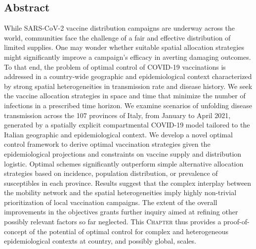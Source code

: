\begin{fullwidth}
\section{Abstract}
While SARS-CoV-2 vaccine distribution campaigns are underway across the world, communities face the challenge of a fair and effective distribution of limited supplies. One may wonder whether suitable spatial allocation strategies might significantly improve a campaign's efficacy in averting damaging outcomes. To that end, the problem of optimal control of COVID-19 vaccinations is addressed in a country-wide geographic and epidemiological context characterized by strong spatial heterogeneities in transmission rate and disease history. We seek the vaccine allocation strategies in space and time that minimize the number of infections in a prescribed time horizon. We examine scenarios of unfolding disease transmission across the 107 provinces of Italy, from January to April 2021, generated by a spatially explicit compartmental COVID-19 model tailored to the Italian geographic and epidemiological context. We develop a novel optimal control framework to derive optimal vaccination strategies given the epidemiological projections and constraints on vaccine supply and distribution logistic. Optimal schemes significantly outperform simple alternative allocation strategies based on incidence, population distribution, or prevalence of susceptibles in each province. Results suggest that the complex interplay between the mobility network and the spatial heterogeneities imply highly non-trivial prioritization of local vaccination campaigns. The extent of the overall improvements in the objectives grants further inquiry aimed at refining other possibly relevant factors so far neglected. This \textsc{Chapter} thus provides a proof-of-concept of the potential of optimal control for complex and heterogeneous epidemiological contexts at country, and possibly global, scales.
\end{fullwidth}


